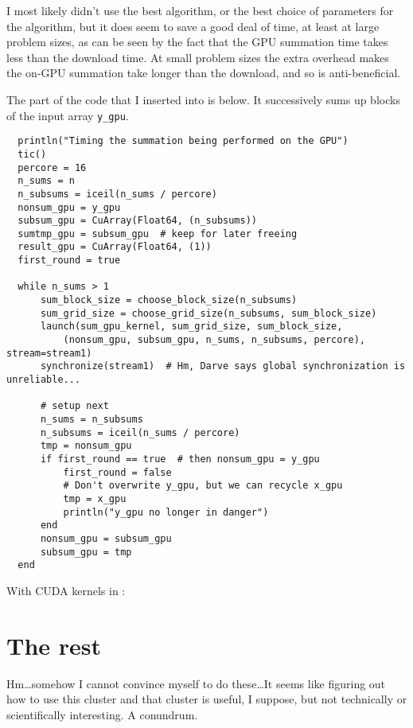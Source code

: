 \documentclass[11pt]{article}
\begin{document}
I most likely didn't use the best algorithm, or the best choice of parameters
for the algorithm, but it does seem to save a good deal of time, at least at
large problem sizes, as can be seen by the fact that the GPU summation time
takes less than the download time. At small problem sizes the extra overhead
makes the on-GPU summation take longer than the download, and so is
anti-beneficial.

The part of the code that I inserted into  is below. It
successively sums up blocks of the input array {\tt y\_gpu}.
\begin{center}
  \begin{verbatim}
  println("Timing the summation being performed on the GPU")
  tic()
  percore = 16
  n_sums = n
  n_subsums = iceil(n_sums / percore)
  nonsum_gpu = y_gpu
  subsum_gpu = CuArray(Float64, (n_subsums))
  sumtmp_gpu = subsum_gpu  # keep for later freeing
  result_gpu = CuArray(Float64, (1))
  first_round = true

  while n_sums > 1
      sum_block_size = choose_block_size(n_subsums)
      sum_grid_size = choose_grid_size(n_subsums, sum_block_size)
      launch(sum_gpu_kernel, sum_grid_size, sum_block_size,
          (nonsum_gpu, subsum_gpu, n_sums, n_subsums, percore), stream=stream1)
      synchronize(stream1)  # Hm, Darve says global synchronization is unreliable...

      # setup next
      n_sums = n_subsums
      n_subsums = iceil(n_sums / percore)
      tmp = nonsum_gpu
      if first_round == true  # then nonsum_gpu = y_gpu
          first_round = false
          # Don't overwrite y_gpu, but we can recycle x_gpu
          tmp = x_gpu
          println("y_gpu no longer in danger")
      end
      nonsum_gpu = subsum_gpu
      subsum_gpu = tmp
  end
  \end{verbatim}
\end{center}


With CUDA kernels in :



\section{The rest}

Hm\ldots somehow I cannot convince myself to do these\ldots It seems like
figuring out how to use this cluster and that cluster is useful, I suppose, but
not technically or scientifically interesting. A conundrum.
\end{document}
